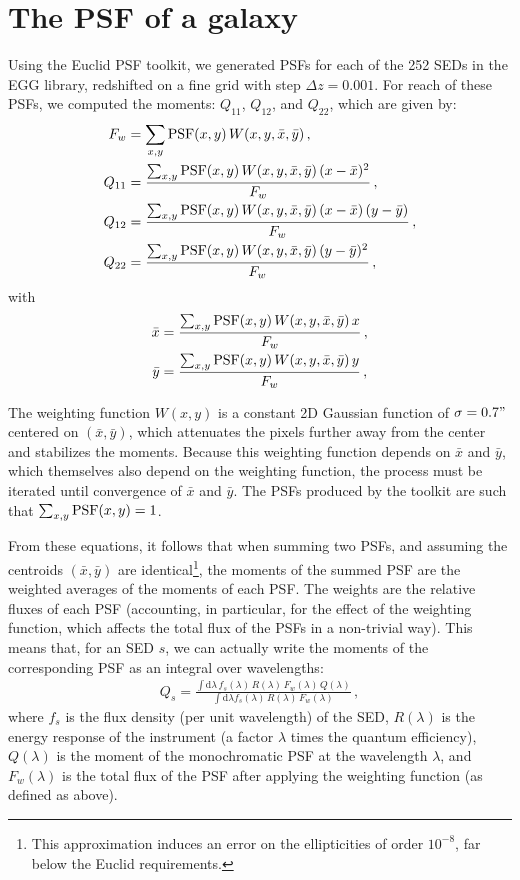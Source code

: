 \documentclass[11pt,a4paper]{article}
\newcommand{\dd}{\mathrm{d}}
\numberwithin{equation}{section}
\begin{document}
\section{The PSF of a galaxy}

Using the Euclid PSF toolkit, we generated PSFs for each of the 252 SEDs in the EGG library, redshifted on a fine grid with step $\Delta z = 0.001$. For reach of these PSFs, we computed the moments: $Q_{11}$, $Q_{12}$, and $Q_{22}$, which are given by:
\begin{align}
F_w &= \sum_{x, y} {\rm PSF}(x,y)\,W(x,y,\bar{x},\bar{y})\,, \\
Q_{11} &= \frac{\sum_{x, y} {\rm PSF}(x,y)\,W(x,y,\bar{x},\bar{y})\,(x - \bar{x})^2}{F_w}\,, \\
Q_{12} &= \frac{\sum_{x, y} {\rm PSF}(x,y)\,W(x,y,\bar{x},\bar{y})\,(x - \bar{x})\,(y - \bar{y})}{F_w}\,, \\
Q_{22} &= \frac{\sum_{x, y} {\rm PSF}(x,y)\,W(x,y,\bar{x},\bar{y})\,(y - \bar{y})^2}{F_w}\,, \\
\end{align}
with
\begin{align}
\bar{x} &= \frac{\sum_{x, y} {\rm PSF}(x,y)\,W(x,y,\bar{x},\bar{y})\,x}{F_w}\,, \\
\bar{y} &= \frac{\sum_{x, y} {\rm PSF}(x,y)\,W(x,y,\bar{x},\bar{y})\,y}{F_w}\,,
\end{align}

The weighting function $W(x,y)$ is a constant 2D Gaussian function of $\sigma=0.7"$ centered on $(\bar{x}, \bar{y})$, which attenuates the pixels further away from the center and stabilizes the moments. Because this weighting function depends on $\bar{x}$ and $\bar{y}$, which themselves also depend on the weighting function, the process must be iterated until convergence of $\bar{x}$ and $\bar{y}$. The PSFs produced by the toolkit are such that $\sum_{x,y}{\rm PSF}(x,y) = 1$.

From these equations, it follows that when summing two PSFs, and assuming the centroids $(\bar{x},\bar{y})$ are identical\footnote{This approximation induces an error on the ellipticities of order $10^{-8}$, far below the Euclid requirements.}, the moments of the summed PSF are the weighted averages of the moments of each PSF. The weights are the relative fluxes of each PSF (accounting, in particular, for the effect of the weighting function, which affects the total flux of the PSFs in a non-trivial way). This means that, for an SED $s$, we can actually write the moments of the corresponding PSF as an integral over wavelengths:
\begin{align}
Q_s = \frac{\int \dd\lambda\,f_s(\lambda)\,R(\lambda)\,F_w(\lambda)\,Q(\lambda)}{\int \dd\lambda f_s(\lambda)\,R(\lambda)\,F_w(\lambda)}\,,
\end{align}
where $f_s$ is the flux density (per unit wavelength) of the SED, $R(\lambda)$ is the energy response of the instrument (a factor $\lambda$ times the quantum efficiency), $Q(\lambda)$ is the moment of the monochromatic PSF at the wavelength $\lambda$, and $F_w(\lambda)$ is the total flux of the PSF after applying the weighting function (as defined as above).
\end{document}
